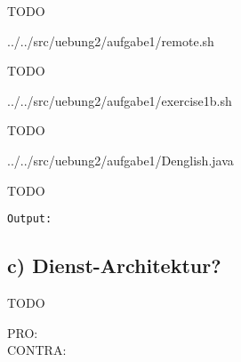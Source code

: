 {\sf TODO}


	{../../src/uebung2/aufgabe1/remote.sh}

{\sf TODO}


	{../../src/uebung2/aufgabe1/exercise1b.sh}

{\sf TODO}


	{../../src/uebung2/aufgabe1/Denglish.java}

{\sf TODO}

\begin{verbatim}
Output:
\end{verbatim}

	
\subsection*{c) Dienst-Architektur?}
{\sf TODO}

\begin{description}
\item[PRO:]
\item[CONTRA:]
\end{description}
